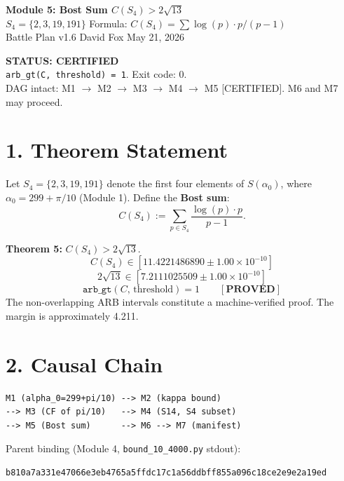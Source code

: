 \documentclass[11pt,letterpaper]{article}
\begin{document}
\begin{center}
{\Large\bfseries Module 5: Bost Sum $C(S_4) > 2\sqrt{13}$}\\[4pt]
{\large $S_4 = \{2, 3, 19, 191\}$ \quad Formula: $C(S_4) = \sum \log(p) \cdot p/(p-1)$}\\[2pt]
{\normalsize Battle Plan v1.6 \quad David Fox \quad May 21, 2026}
\end{center}
\vspace{0.5em}
\begin{center}
\colorbox{certgreen!15}{\parbox{0.85\textwidth}{\centering
\textcolor{certgreen}{\bfseries STATUS: CERTIFIED \checkmark}\\
\texttt{arb\_gt(C, threshold) = 1}. Exit code: 0.\\
DAG intact: M1 $\to$ M2 $\to$ M3 $\to$ M4 $\to$ M5 [CERTIFIED]. M6 and M7 may proceed.
}}
\end{center}

\section*{1. Theorem Statement}

Let $S_4 = \{2, 3, 19, 191\}$ denote the first four elements of $S(\alpha_0)$,
where $\alpha_0 = 299 + \pi/10$ (Module 1).
Define the \textbf{Bost sum}:
\[
  C(S_4) := \sum_{p \in S_4} \frac{\log(p) \cdot p}{p - 1}.
\]

\textbf{Theorem 5:} $C(S_4) > 2\sqrt{13}$.
\[
  C(S_4) \in [11.4221486890 \pm 1.00 \times 10^{-10}]
\]
\[
  2\sqrt{13} \in [7.2111025509 \pm 1.00 \times 10^{-10}]
\]
\[
  \texttt{arb\_gt}(C,\,\text{threshold}) = 1 \qquad [\textbf{PROVED}]
\]
The non-overlapping ARB intervals constitute a machine-verified proof.
The margin is approximately 4.211.

\section*{2. Causal Chain}

\begin{lstlisting}
M1 (alpha_0=299+pi/10) --> M2 (kappa bound)
--> M3 (CF of pi/10)   --> M4 (S14, S4 subset)
--> M5 (Bost sum)      --> M6 --> M7 (manifest)
\end{lstlisting}

Parent binding (Module 4, \texttt{bound\_10\_4000.py} stdout):
\begin{lstlisting}
b810a7a331e47066e3eb4765a5ffdc17c1a56ddbff855a096c18ce2e9e2a19ed
\end{lstlisting}
\end{document}
